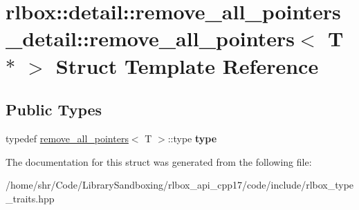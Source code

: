\hypertarget{structrlbox_1_1detail_1_1remove__all__pointers__detail_1_1remove__all__pointers_3_01T_01_5_01_4}{}\section{rlbox\+:\+:detail\+:\+:remove\+\_\+all\+\_\+pointers\+\_\+detail\+:\+:remove\+\_\+all\+\_\+pointers$<$ T $\ast$ $>$ Struct Template Reference}
\label{structrlbox_1_1detail_1_1remove__all__pointers__detail_1_1remove__all__pointers_3_01T_01_5_01_4}
\subsection*{Public Types}
\begin{DoxyCompactItemize}
\item 
\mbox{\label{structrlbox_1_1detail_1_1remove__all__pointers__detail_1_1remove__all__pointers_3_01T_01_5_01_4_a5e84dc13820435940c4f62c8b727be25}} 
typedef \hyperlink{structrlbox_1_1detail_1_1remove__all__pointers__detail_1_1remove__all__pointers}{remove\+\_\+all\+\_\+pointers}$<$ T $>$\+::type {\bfseries type}
\end{DoxyCompactItemize}


The documentation for this struct was generated from the following file\+:\begin{DoxyCompactItemize}
\item 
/home/shr/\+Code/\+Library\+Sandboxing/rlbox\+\_\+api\+\_\+cpp17/code/include/rlbox\+\_\+type\+\_\+traits.\+hpp\end{DoxyCompactItemize}
